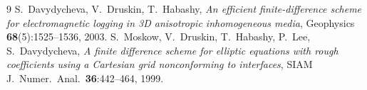 \documentclass[11pt]{article}
\begin{document}
\begin{thebibliography}{9}
 S.~Davydycheva, V.~Druskin, T.~Habashy,
\emph{An efficient finite-difference scheme for electromagnetic logging in 3D
anisotropic inhomogeneous media}, Geophysics \textbf{68}(5):1525--1536, 2003.
 S.~Moskow, V.~Druskin, T.~Habashy, P.~Lee,
S.~Davydycheva, \emph{A finite difference scheme for elliptic equations with
rough coefficients using a Cartesian grid nonconforming to interfaces},
SIAM J.\ Numer.\ Anal.\ \textbf{36}:442--464, 1999.
\end{thebibliography}
\end{document}
